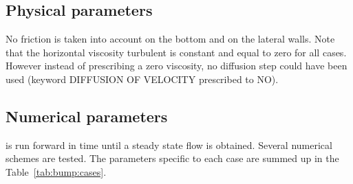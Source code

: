 \subsection{Physical parameters}

No friction is taken into account on the bottom and on the lateral walls.
Note that the horizontal viscosity turbulent is constant and equal to zero for all cases.
However instead of prescribing a zero viscosity, no diffusion step could
have been used (keyword DIFFUSION OF VELOCITY prescribed to NO).

\subsection{Numerical parameters}

 is run forward in time until a steady state flow is obtained.
Several numerical schemes are tested.
The parameters specific to each case are summed up in the Table~\ref{tab:bump:cases}.

\begin{table}[H]
  \caption{List of the simulation parameters used for the cases tested in the bump example.}
  \label{tab:bump:cases}
\end{table}

